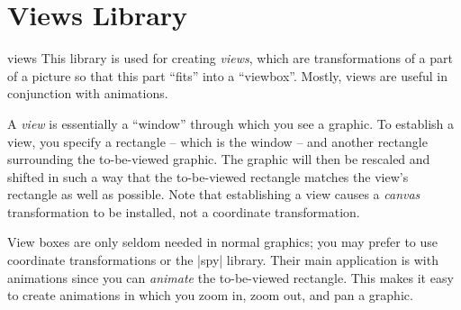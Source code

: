 %
%
%


\section[library-views]{Views Library}
\label{section-library-views}

\begin{tikzlibrary}{views}
    This library is used for creating \emph{views}, which are transformations
    of a part of a picture so that this part ``fits'' into a ``viewbox''.
    Mostly, views are useful in conjunction with animations.
\end{tikzlibrary}

A \emph{view} is essentially a ``window'' through which you see a graphic. To
establish a view, you specify a rectangle -- which is the window -- and another
rectangle surrounding the to-be-viewed graphic. The graphic will then be
rescaled and shifted in such a way that the to-be-viewed rectangle matches the
view's rectangle as well as possible. Note that establishing a view causes a
\emph{canvas} transformation to be installed, not a coordinate transformation.

View boxes are only seldom needed in normal graphics; you may prefer to use
coordinate transformations or the |spy| library. Their main application is with
animations since you can \emph{animate} the to-be-viewed rectangle. This makes
it easy to create animations in which you zoom in, zoom out, and pan a graphic.

